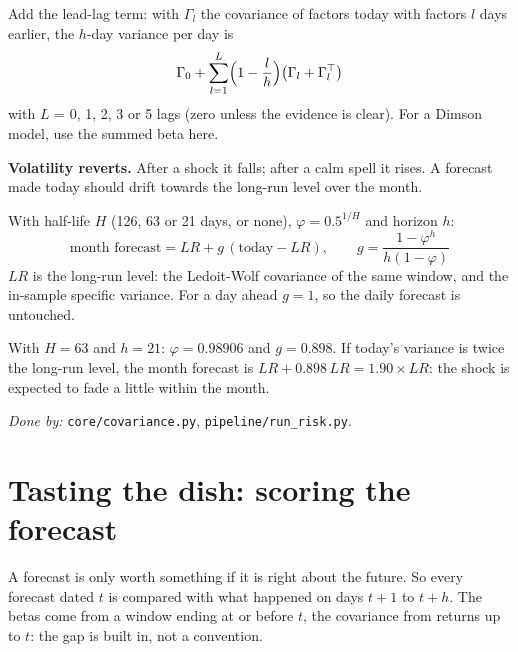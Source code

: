 \documentclass[11pt,a4paper]{article}
\newcommand{\doneby}[1]{\par{\raggedright\small\textit{Done by:} #1\par}}
\begin{document}
\begin{method}
Add the lead-lag term: with $\Gamma_l$ the covariance of factors today with factors $l$
days earlier, the $h$-day variance per day is
\[
  \Gamma_0 + \sum_{l=1}^{L}\Bigl(1-\frac{l}{h}\Bigr)\bigl(\Gamma_l + \Gamma_l^{\top}\bigr)
\]
with $L$ = 0, 1, 2, 3 or 5 lags (zero unless the evidence is clear). For a Dimson model,
use the summed beta here.
\end{method}

\textbf{Volatility reverts.} After a shock it falls; after a calm spell it rises. A
forecast made today should drift towards the long-run level over the month.

\begin{method}
With half-life $H$ (126, 63 or 21 days, or none), $\varphi = 0.5^{1/H}$ and horizon $h$:
\[
  \text{month forecast} = LR + g\,(\text{today} - LR),\qquad
  g = \frac{1-\varphi^{h}}{h(1-\varphi)}
\]
$LR$ is the long-run level: the Ledoit-Wolf covariance of the same window, and the
in-sample specific variance. For a day ahead $g = 1$, so the daily forecast is untouched.
\end{method}

\begin{example}
With $H = 63$ and $h = 21$: $\varphi = 0.98906$ and $g = 0.898$. If today's variance
is twice the long-run level, the month forecast is $LR + 0.898\,LR = 1.90\times LR$:
the shock is expected to fade a little within the month.
\end{example}

\doneby{\texttt{core/covariance.py}, \texttt{pipeline/run\_risk.py}.}

\section{Tasting the dish: scoring the forecast}\label{part:score}

A forecast is only worth something if it is right about the future. So every
forecast dated $t$ is compared with what happened on days $t+1$ to $t+h$. The
betas come from a window ending at or before $t$, the covariance from returns up to
$t$: the gap is built in, not a convention.
\end{document}
